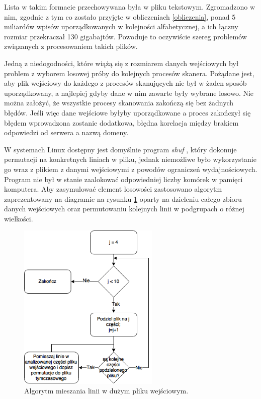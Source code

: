 Lista w takim formacie przechowywana była w pliku tekstowym. Zgromadzono w nim, zgodnie z tym co zostało przyjęte
w obliczeniach \ref{obliczenia}, ponad 5 miliardów wpisów uporządkowanych w kolejności alfabetycznej, a ich łączny rozmiar przekraczał
130 gigabajtów. Powoduje to oczywiście szereg problemów związanych z procesowaniem takich plików.

Jedną z niedogodności, które wiążą się z rozmiarem danych wejściowych był problem z wyborem losowej próby do kolejnych procesów
skanera. Pożądane jest, aby plik wejściowy do każdego z procesów skanujących nie był w żaden sposób uporządkowany, a najlepiej
gdyby dane w nim zawarte były wybrane losowo. Nie można założyć, że wszystkie procesy skanowania zakończą się bez żadnych błędów.
Jeśli więc dane wejściowe byłyby uporządkowane a proces zakończył się błędem wprowadzona zostanie dodatkowa, błędna korelacja między
brakiem odpowiedzi od serwera a nazwą domeny.

W systemach Linux dostępny jest domyślnie program \textit{shuf} \cite{shuf}, który dokonuje permutacji na konkretnych liniach w pliku,
jednak niemożliwe było wykorzystanie go wraz z plikiem z danymi wejściowymi z powodów ograniczeń wydajnościowych. Program nie był w
stanie zaalokować odpowiedniej liczby komórek w pamięci komputera. Aby zasymulować element losowości zastosowano algorytm zaprezentowany
na diagramie na rysunku \ref{fig:shufAlgorithm} oparty na dzieleniu całego zbioru danych wejściowych oraz permutowaniu kolejnych linii
w podgrupach o różnej wielkości.

\begin{figure}[h]
	\centering
	\includegraphics[width=0.6\textwidth]{image/sfuh}
	\caption{Algorytm mieszania linii w dużym pliku wejściowym.}
	\label{fig:shufAlgorithm}
\end{figure}

